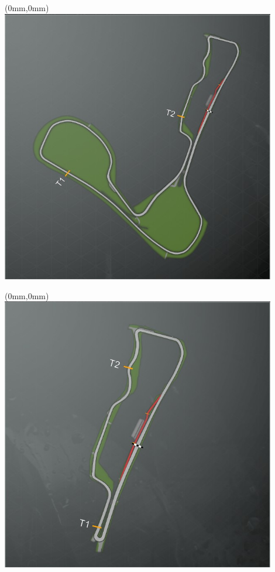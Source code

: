 \null\newpage
\begin{textblock*}{30mm}(0mm,0mm)%
\includegraphics[width=120mm]{TR/2015-05-20_00010.png}
\end{textblock*}
\null\newpage
\begin{textblock*}{30mm}(0mm,0mm)%
\includegraphics[width=120mm]{TR/2015-05-20_00012.png}
\end{textblock*}
